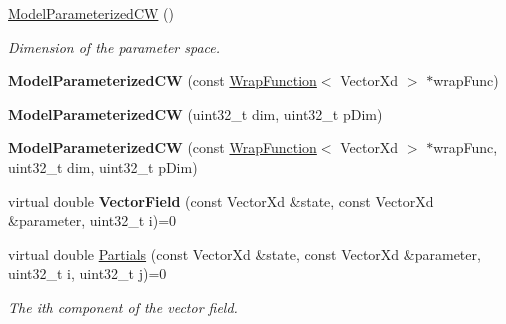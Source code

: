 \begin{DoxyCompactItemize}
\item 
\hypertarget{struct_d_r_d_s_p_1_1_model_parameterized_c_w_a2be94490482d194c8c25aed1b8f99b4d}{\hyperlink{struct_d_r_d_s_p_1_1_model_parameterized_c_w_a2be94490482d194c8c25aed1b8f99b4d}{Model\-Parameterized\-C\-W} ()}\label{struct_d_r_d_s_p_1_1_model_parameterized_c_w_a2be94490482d194c8c25aed1b8f99b4d}

\begin{DoxyCompactList}\small\item\em Dimension of the parameter space. \end{DoxyCompactList}\item 
\hypertarget{struct_d_r_d_s_p_1_1_model_parameterized_c_w_a6dc3f89073452ab9fe6e0060aa14ad24}{{\bfseries Model\-Parameterized\-C\-W} (const \hyperlink{struct_d_r_d_s_p_1_1_wrap_function}{Wrap\-Function}$<$ Vector\-Xd $>$ $\ast$wrap\-Func)}\label{struct_d_r_d_s_p_1_1_model_parameterized_c_w_a6dc3f89073452ab9fe6e0060aa14ad24}

\item 
\hypertarget{struct_d_r_d_s_p_1_1_model_parameterized_c_w_a81d7ee9a3974ed8bee6664609ee96b69}{{\bfseries Model\-Parameterized\-C\-W} (uint32\-\_\-t dim, uint32\-\_\-t p\-Dim)}\label{struct_d_r_d_s_p_1_1_model_parameterized_c_w_a81d7ee9a3974ed8bee6664609ee96b69}

\item 
\hypertarget{struct_d_r_d_s_p_1_1_model_parameterized_c_w_a9ce0b83304e3da9c41142baf2e5f8b75}{{\bfseries Model\-Parameterized\-C\-W} (const \hyperlink{struct_d_r_d_s_p_1_1_wrap_function}{Wrap\-Function}$<$ Vector\-Xd $>$ $\ast$wrap\-Func, uint32\-\_\-t dim, uint32\-\_\-t p\-Dim)}\label{struct_d_r_d_s_p_1_1_model_parameterized_c_w_a9ce0b83304e3da9c41142baf2e5f8b75}

\item 
\hypertarget{struct_d_r_d_s_p_1_1_model_parameterized_c_w_a21a471d9a6eebf3939b6605a9243253d}{virtual double {\bfseries Vector\-Field} (const Vector\-Xd \&state, const Vector\-Xd \&parameter, uint32\-\_\-t i)=0}\label{struct_d_r_d_s_p_1_1_model_parameterized_c_w_a21a471d9a6eebf3939b6605a9243253d}

\item 
\hypertarget{struct_d_r_d_s_p_1_1_model_parameterized_c_w_a6b8e4d5f583b7553db1986a6ef859c86}{virtual double \hyperlink{struct_d_r_d_s_p_1_1_model_parameterized_c_w_a6b8e4d5f583b7553db1986a6ef859c86}{Partials} (const Vector\-Xd \&state, const Vector\-Xd \&parameter, uint32\-\_\-t i, uint32\-\_\-t j)=0}\label{struct_d_r_d_s_p_1_1_model_parameterized_c_w_a6b8e4d5f583b7553db1986a6ef859c86}

\begin{DoxyCompactList}\small\item\em The ith component of the vector field. \end{DoxyCompactList}\end{DoxyCompactItemize}

